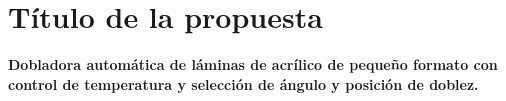 \section{Título de la propuesta}
\textbf{Dobladora automática de láminas de acrílico de pequeño formato con control de temperatura y selección de ángulo y posición de doblez.}
